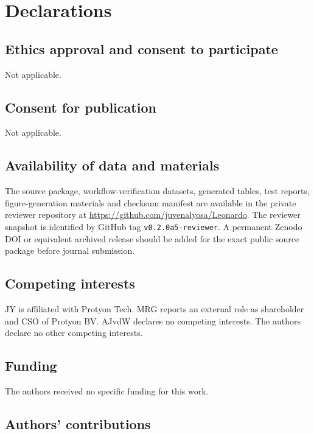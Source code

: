 \documentclass[pdflatex,sn-vancouver-num]{sn-jnl}
\begin{document}
\section*{Declarations}

\subsection*{Ethics approval and consent to participate}

Not applicable.

\subsection*{Consent for publication}

Not applicable.

\subsection*{Availability of data and materials}

The source package, workflow-verification datasets, generated tables, test reports, figure-generation materials and checksum manifest are available in the private reviewer repository at \url{https://github.com/juvenalyosa/Leonardo}.  The reviewer snapshot is identified by GitHub tag \texttt{v0.2.0a5-reviewer}.  A permanent Zenodo DOI or equivalent archived release should be added for the exact public source package before journal submission.

\subsection*{Competing interests}

JY is affiliated with Protyon Tech.  MRG reports an external role as shareholder and CSO of Protyon BV.  AJvdW declares no competing interests.  The authors declare no other competing interests.

\subsection*{Funding}

The authors received no specific funding for this work.

\subsection*{Authors' contributions}
\end{document}
